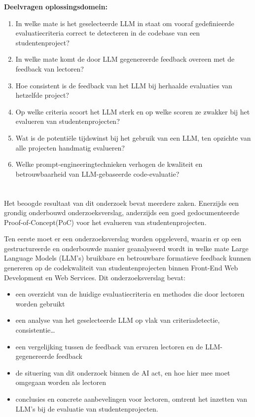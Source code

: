 \vspace{1em}

\textbf{Deelvragen oplossingsdomein:}
\begin{enumerate}
    \item In welke mate is het geselecteerde LLM in staat om vooraf gedefinieerde evaluatiecriteria correct te detecteren in de codebase van een studentenproject?
    \item In welke mate komt de door LLM gegenereerde feedback overeen met de feedback van lectoren?
    \item Hoe consistent is de feedback van het LLM bij herhaalde evaluaties van hetzelfde project?
    \item Op welke criteria scoort het LLM sterk en op welke scoren ze zwakker bij het evalueren van studentenprojecten?
    \item Wat is de potentiële tijdswinst bij het gebruik van een LLM, ten opzichte van alle projecten handmatig evalueren?
    \item Welke prompt-engineeringtechnieken verhogen de kwaliteit en betrouwbaarheid van LLM-gebaseerde code-evaluatie?
\end{enumerate}

\section{}%
\label{sec:onderzoeksdoelstelling}

Het beoogde resultaat van dit onderzoek bevat meerdere zaken. Enerzijds een grondig onderbouwd onderzoeksverslag, anderzijds een goed gedocumenteerde Proof-of-Concept(PoC) voor het evalueren van studentenprojecten.

\vspace{1em}

Ten eerste moet er een onderzoeksverslag worden opgeleverd, waarin er op een gestructureerde en onderbouwde manier geanalyseerd wordt in welke mate Large Language Models (LLM's) bruikbare en betrouwbare formatieve feedback kunnen genereren op de codekwaliteit van studentenprojecten binnen Front-End Web Development en Web Services. Dit onderzoeksverslag bevat:
\begin{itemize}
    \item een overzicht van de huidige evaluatiecriteria en methodes die door lectoren worden gebruikt
    \item een analyse van het geselecteerde LLM op vlak van criteriadetectie, consistentie\ldots
    \item een vergelijking tussen de feedback van ervaren lectoren en de LLM-gegenereerde feedback
    \item de situering van dit onderzoek binnen de AI act, en hoe hier mee moet omgegaan worden als lectoren
    \item conclusies en concrete aanbevelingen voor lectoren, omtrent het inzetten van LLM's bij de evaluatie van studentenprojecten.
\end{itemize}

